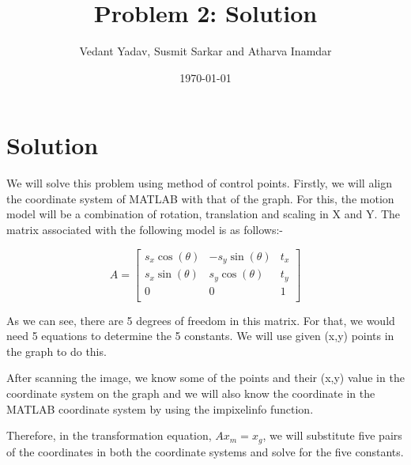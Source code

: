 \documentclass[12pt]{article}
\title{Problem 2: Solution}
\author{Vedant Yadav, Susmit Sarkar and Atharva Inamdar}
\date{\today}
\begin{document}
\maketitle

\section*{Solution}

We will solve this problem using method of control points.
Firstly, we will align the coordinate system of MATLAB with that of the graph. For this, the motion model will be a combination of rotation, translation and scaling in X and Y. The matrix associated with the following model is as follows:-

\hspace{5cm}
\[A = 
\begin{bmatrix}
s_x \cos(\theta) & -s_y \sin(\theta) & t_x \\
s_x \sin(\theta) & s_y \cos(\theta) & t_y \\
0 & 0 & 1 \\
\end{bmatrix}
\]

As we can see, there are 5 degrees of freedom in this matrix. For that, we would need 5 equations to determine the 5 constants. We will use given (x,y) points in the graph to do this.

After scanning the image, we know some of the points and their (x,y) value in the coordinate system on the graph and we will also know the coordinate in the MATLAB coordinate system by using the impixelinfo function. 

Therefore, in the transformation equation, $Ax_m= x_g$, we will substitute five pairs of the coordinates in both the coordinate systems and solve for the five constants. 
\end{document}
